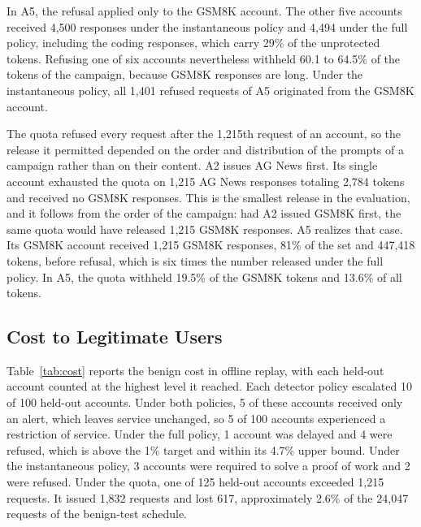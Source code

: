\documentclass[conference]{IEEEtran}
\begin{document}
In A5, the refusal applied only to the GSM8K account. The other five accounts received 4,500 responses under the instantaneous policy and 4,494 under the full policy, including the coding responses, which carry 29\% of the unprotected tokens. Refusing one of six accounts nevertheless withheld 60.1 to 64.5\% of the tokens of the campaign, because GSM8K responses are long. Under the instantaneous policy, all 1,401 refused requests of A5 originated from the GSM8K account.

The quota refused every request after the 1,215th request of an account, so the release it permitted depended on the order and distribution of the prompts of a campaign rather than on their content. A2 issues AG News first. Its single account exhausted the quota on 1,215 AG News responses totaling 2,784 tokens and received no GSM8K responses. This is the smallest release in the evaluation, and it follows from the order of the campaign: had A2 issued GSM8K first, the same quota would have released 1,215 GSM8K responses. A5 realizes that case. Its GSM8K account received 1,215 GSM8K responses, 81\% of the set and 447,418 tokens, before refusal, which is six times the number released under the full policy. In A5, the quota withheld 19.5\% of the GSM8K tokens and 13.6\% of all tokens.

\subsection{Cost to Legitimate Users}
Table~\ref{tab:cost} reports the benign cost in offline replay, with each held-out account counted at the highest level it reached. Each detector policy escalated 10 of 100 held-out accounts. Under both policies, 5 of these accounts received only an alert, which leaves service unchanged, so 5 of 100 accounts experienced a restriction of service. Under the full policy, 1 account was delayed and 4 were refused, which is above the 1\% target and within its 4.7\% upper bound. Under the instantaneous policy, 3 accounts were required to solve a proof of work and 2 were refused. Under the quota, one of 125 held-out accounts exceeded 1,215 requests. It issued 1,832 requests and lost 617, approximately 2.6\% of the 24,047 requests of the benign-test schedule.
\end{document}
